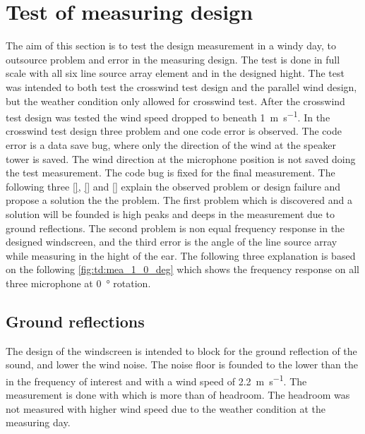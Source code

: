 \section{Test of measuring design}
The aim of this section is to test the design measurement in a windy day, to outsource problem and error in the measuring design. The test is done in full scale with all six line source array element and in the designed hight. The test was intended to both test the crosswind test design and the parallel wind design, but the weather condition only allowed for crosswind test. After the crosswind test design was tested the wind speed dropped to beneath \SI{1}{\meter\per\second}.
In the crosswind test design three problem and one code error is observed. The code error is a data save bug, where only the direction of the wind at the speaker tower is saved. The wind direction at the microphone position is not saved doing the test measurement. The code bug is fixed for the final measurement. The following three \autoref{}, \autoref{} and \autoref{} explain the observed problem or design failure and propose a solution the the problem. The first problem which is discovered and a solution will be founded is high peaks and deeps in the measurement due to ground reflections. The second problem is non equal frequency response in the designed windscreen, and the third error is the angle of the line source array while measuring in the hight of the ear.  The following three explanation is based on the following \autoref{fig:td:mea_1_0_deg} which shows the frequency response on all three microphone at \SI{0}{\degree} rotation.





\subsection{Ground reflections}
The design of the windscreen is intended to block for the ground reflection of the sound, and lower the wind noise. The noise floor is founded to the lower than the  in the frequency of interest and with a wind speed of \SI{2.2}{\meter\per\second}. The measurement is done with  which is more than  of headroom. The headroom was not measured with higher wind speed due to the weather condition at the measuring day. 

